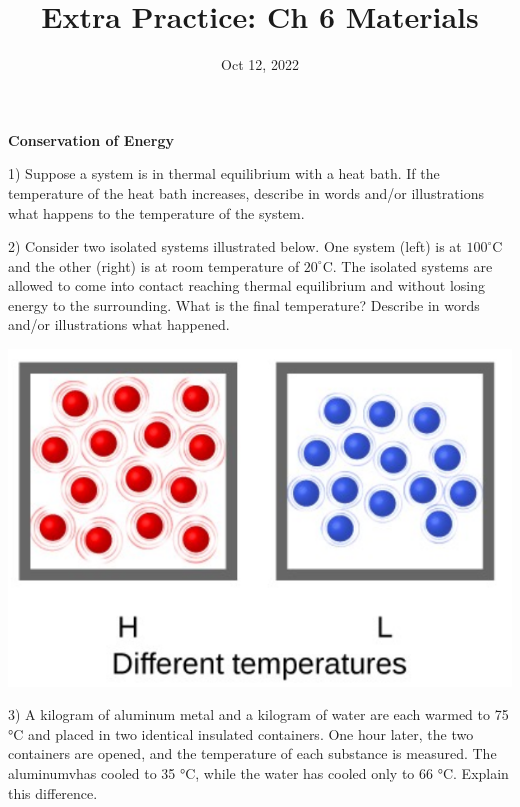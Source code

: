 \documentclass[12pt]{article}
\title{\textbf{Extra Practice: Ch 6 Materials}}
\date{Oct 12, 2022}
\begin{document}
\maketitle 

\textbf{Conservation of Energy}

1) Suppose a system is in thermal equilibrium with a heat bath. If the temperature
of the heat bath increases, describe in words and/or illustrations what happens to
the temperature of the system.

% 

2) Consider two isolated systems illustrated below. One system (left) is at $100^\circ\text{C}$
and the other (right) is at room temperature of $20^\circ\text{C}$. The isolated systems are allowed
to come into contact reaching thermal equilibrium and without losing energy to the surrounding.
What is the final temperature? Describe in words and/or illustrations what happened.

\begin{center}
  \includegraphics[scale=0.25]{isolated_sys.png}
\end{center}


3) A kilogram of aluminum metal and a kilogram of water are each warmed to 75 °C and placed
in two identical insulated containers. One hour later, the two containers are opened, and
the temperature of each substance is measured. The aluminumvhas cooled to 35 °C, while the
water has cooled only to 66 °C. Explain this difference.
\end{document}
